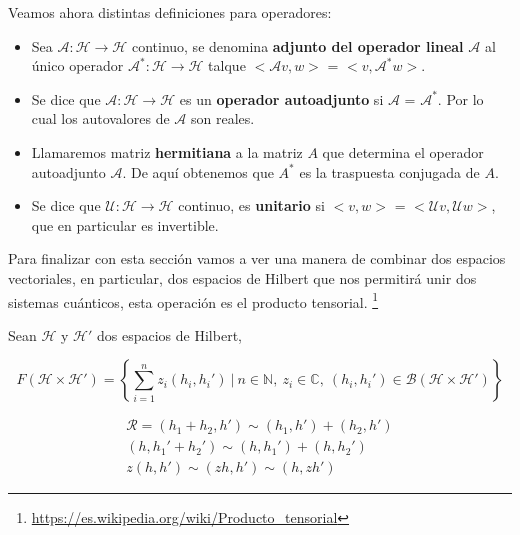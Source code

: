 \newpage

Veamos ahora distintas definiciones para operadores:
\begin{itemize}
    \item Sea $\mathscr{A}:\mathscr{H} \rightarrow \mathscr{H}$ continuo, se denomina \textbf{adjunto del operador lineal} $\mathscr{A}$ al único operador   $\mathscr{A}^{*}:\mathscr{H} \rightarrow \mathscr{H}$ talque $<\mathscr{A}v,w>$ = $<v,\mathscr{A}^{*}w>$.
    \item Se dice que $\mathscr{A}:\mathscr{H} \rightarrow \mathscr{H}$ es un \textbf{operador autoadjunto} si $\mathscr{A}$ = $\mathscr{A}^{*}$. Por lo cual los autovalores de $\mathscr{A}$ son reales.
    \item Llamaremos matriz \textbf{hermitiana} a la matriz $A$ que determina el operador autoadjunto $\mathscr{A}$. De aquí obtenemos que $A^{*}$ es la traspuesta conjugada de $A$.
    \item Se dice que $\mathscr{U}:\mathscr{H} \rightarrow \mathscr{H}$  continuo, es \textbf{unitario} si $<v,w>$ = $<\mathscr{U}v,\mathscr{U}w>$, que en particular es invertible.
\end{itemize}

\vspace{5pt}

Para finalizar con esta sección vamos a ver una manera de combinar dos espacios vectoriales, en particular, dos espacios de Hilbert que nos permitirá unir dos sistemas cuánticos, esta operación es el producto tensorial.\cite{B:Nielsen:2002} \footnote{\url{https://es.wikipedia.org/wiki/Producto_tensorial}}

\vspace{10pt}

Sean $\mathscr{H}$ y $\mathscr{H}'$ dos espacios de Hilbert,

\vspace{5pt}
\begin{equation*}
    F(\mathscr{H} \times \mathscr{H}') = \left\lbrace \sum_{i=1}^{n}z_{i} (h_{i},h_{i}')\:|\:n \in \mathbb{N},\: z_{i} \in \mathbb{C},\:(h_{i},h_{i}') \in \mathscr{B}(\mathscr{H} \times \mathscr{H}') \right\rbrace
\end{equation*}

\vspace{5pt}
\begin{equation*}
\begin{split}
    \mathscr{R} =  (h_{1}+h_{2},h') \sim (h_{1},h') + (h_{2},h') \\ 
    (h,h_{1}'+h_{2}') \sim (h,h_{1}') + (h,h_{2}') \\
    z(h,h') \sim (z h,h') \sim (h,z h')
\end{split}
\end{equation*}

